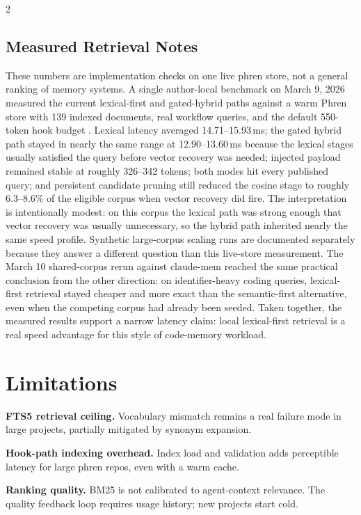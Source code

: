 \documentclass[10pt]{article}
\begin{document}
\begin{multicols}{2}
\subsection{Measured Retrieval Notes}

These numbers are implementation checks on one live phren store, not a general ranking of memory systems. A single author-local benchmark on March 9, 2026 measured the current lexical-first and gated-hybrid paths against a warm Phren store with 139 indexed documents, real workflow queries, and the default 550-token hook budget \cite{phren-bench}. Lexical latency averaged 14.71--15.93\,ms; the gated hybrid path stayed in nearly the same range at 12.90--13.60\,ms because the lexical stages usually satisfied the query before vector recovery was needed; injected payload remained stable at roughly 326--342 tokens; both modes hit every published query; and persistent candidate pruning still reduced the cosine stage to roughly 6.3--8.6\% of the eligible corpus when vector recovery did fire.
The interpretation is intentionally modest: on this corpus the lexical path was strong enough that vector recovery was usually unnecessary, so the hybrid path inherited nearly the same speed profile. Synthetic large-corpus scaling runs are documented separately because they answer a different question than this live-store measurement.
The March 10 shared-corpus rerun against claude-mem reached the same practical conclusion from the other direction: on identifier-heavy coding queries, lexical-first retrieval stayed cheaper and more exact than the semantic-first alternative, even when the competing corpus had already been seeded. Taken together, the measured results support a narrow latency claim: local lexical-first retrieval is a real speed advantage for this style of code-memory workload.

\pagebreak[2]
\section{Limitations}
\label{sec:limitations}

\textbf{FTS5 retrieval ceiling.} Vocabulary mismatch remains a real failure mode in large projects, partially mitigated by synonym expansion.

\textbf{Hook-path indexing overhead.} Index load and validation adds perceptible latency for large phren repos, even with a warm cache.

\textbf{Ranking quality.} BM25 is not calibrated to agent-context relevance. The quality feedback loop requires usage history; new projects start cold.


\end{multicols}
\end{document}
